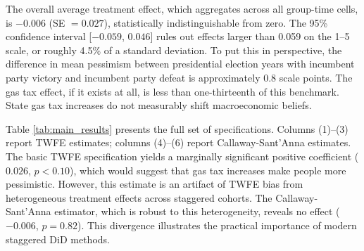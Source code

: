 \documentclass[12pt]{article}
\begin{document}
The overall average treatment effect, which aggregates across all group-time cells, is $-0.006$ (SE $= 0.027$), statistically indistinguishable from zero. The 95\% confidence interval [$-0.059$, $0.046$] rules out effects larger than 0.059 on the 1--5 scale, or roughly 4.5\% of a standard deviation. To put this in perspective, the difference in mean pessimism between presidential election years with incumbent party victory and incumbent party defeat is approximately 0.8 scale points. The gas tax effect, if it exists at all, is less than one-thirteenth of this benchmark. State gas tax increases do not measurably shift macroeconomic beliefs.

Table \ref{tab:main_results} presents the full set of specifications. Columns (1)--(3) report TWFE estimates; columns (4)--(6) report Callaway-Sant'Anna estimates. The basic TWFE specification yields a marginally significant positive coefficient ($0.026$, $p < 0.10$), which would suggest that gas tax increases make people more pessimistic. However, this estimate is an artifact of TWFE bias from heterogeneous treatment effects across staggered cohorts. The Callaway-Sant'Anna estimator, which is robust to this heterogeneity, reveals no effect ($-0.006$, $p = 0.82$). This divergence illustrates the practical importance of modern staggered DiD methods.
\end{document}
